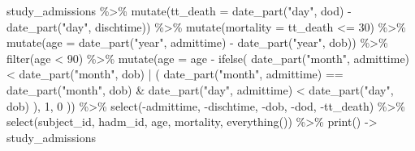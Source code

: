 \documentclass[
]{article}
\newenvironment{Shaded}{\begin{snugshade}}{\end{snugshade}}
\newcommand{\AttributeTok}[1]{\textcolor[rgb]{0.77,0.63,0.00}{#1}}
\newcommand{\DecValTok}[1]{\textcolor[rgb]{0.00,0.00,0.81}{#1}}
\newcommand{\FunctionTok}[1]{\textcolor[rgb]{0.00,0.00,0.00}{#1}}
\newcommand{\NormalTok}[1]{#1}
\newcommand{\OtherTok}[1]{\textcolor[rgb]{0.56,0.35,0.01}{#1}}
\newcommand{\SpecialCharTok}[1]{\textcolor[rgb]{0.00,0.00,0.00}{#1}}
\newcommand{\StringTok}[1]{\textcolor[rgb]{0.31,0.60,0.02}{#1}}
\begin{document}
\begin{Shaded}
\begin{Highlighting}[]
\NormalTok{study\_admissions }\SpecialCharTok{\%\textgreater{}\%}
  \FunctionTok{mutate}\NormalTok{(}\AttributeTok{tt\_death =} \FunctionTok{date\_part}\NormalTok{(}\StringTok{"day"}\NormalTok{, dod) }\SpecialCharTok{{-}} \FunctionTok{date\_part}\NormalTok{(}\StringTok{"day"}\NormalTok{, dischtime)) }\SpecialCharTok{\%\textgreater{}\%}
  \FunctionTok{mutate}\NormalTok{(}\AttributeTok{mortality =}\NormalTok{ tt\_death }\SpecialCharTok{\textless{}=} \DecValTok{30}\NormalTok{) }\SpecialCharTok{\%\textgreater{}\%}
  \FunctionTok{mutate}\NormalTok{(}\AttributeTok{age =} \FunctionTok{date\_part}\NormalTok{(}\StringTok{"year"}\NormalTok{, admittime) }\SpecialCharTok{{-}} \FunctionTok{date\_part}\NormalTok{(}\StringTok{"year"}\NormalTok{, dob)) }\SpecialCharTok{\%\textgreater{}\%}
  \FunctionTok{filter}\NormalTok{(age }\SpecialCharTok{\textless{}} \DecValTok{90}\NormalTok{) }\SpecialCharTok{\%\textgreater{}\%}
  \FunctionTok{mutate}\NormalTok{(}\AttributeTok{age =}\NormalTok{ age }\SpecialCharTok{{-}} \FunctionTok{ifelse}\NormalTok{(}
    \FunctionTok{date\_part}\NormalTok{(}\StringTok{"month"}\NormalTok{, admittime) }\SpecialCharTok{\textless{}} \FunctionTok{date\_part}\NormalTok{(}\StringTok{"month"}\NormalTok{, dob) }\SpecialCharTok{|}
\NormalTok{      (}
        \FunctionTok{date\_part}\NormalTok{(}\StringTok{"month"}\NormalTok{, admittime) }\SpecialCharTok{==} \FunctionTok{date\_part}\NormalTok{(}\StringTok{"month"}\NormalTok{, dob) }\SpecialCharTok{\&}
          \FunctionTok{date\_part}\NormalTok{(}\StringTok{"day"}\NormalTok{, admittime) }\SpecialCharTok{\textless{}} \FunctionTok{date\_part}\NormalTok{(}\StringTok{"day"}\NormalTok{, dob)}
\NormalTok{      ),}
    \DecValTok{1}\NormalTok{,}
    \DecValTok{0}
\NormalTok{  )) }\SpecialCharTok{\%\textgreater{}\%}
  \FunctionTok{select}\NormalTok{(}\SpecialCharTok{{-}}\NormalTok{admittime, }\SpecialCharTok{{-}}\NormalTok{dischtime, }\SpecialCharTok{{-}}\NormalTok{dob, }\SpecialCharTok{{-}}\NormalTok{dod, }\SpecialCharTok{{-}}\NormalTok{tt\_death) }\SpecialCharTok{\%\textgreater{}\%}
  \FunctionTok{select}\NormalTok{(subject\_id, hadm\_id, age, mortality, }\FunctionTok{everything}\NormalTok{()) }\SpecialCharTok{\%\textgreater{}\%}
  \FunctionTok{print}\NormalTok{() }\OtherTok{{-}\textgreater{}}\NormalTok{ study\_admissions}
\end{Highlighting}
\end{Shaded}
\end{document}
